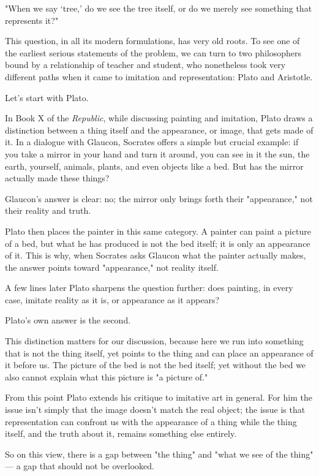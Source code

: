 "When we say `tree,' do we see the tree itself, or do we merely see something that represents it?"

This question, in all its modern formulations, has very old roots. To see one of the earliest serious statements of the problem, we can turn to two philosophers bound by a relationship of teacher and student, who nonetheless took very different paths when it came to imitation and representation: Plato and Aristotle.

Let's start with Plato.

In Book X of the \textit{Republic}, while discussing painting and imitation, Plato draws a distinction between a thing itself and the appearance, or image, that gets made of it. In a dialogue with Glaucon, Socrates offers a simple but crucial example: if you take a mirror in your hand and turn it around, you can see in it the sun, the earth, yourself, animals, plants, and even objects like a bed. But has the mirror actually made these things?

Glaucon's answer is clear: no; the mirror only brings forth their "appearance," not their reality and truth.

Plato then places the painter in this same category. A painter can paint a picture of a bed, but what he has produced is not the bed itself; it is only an appearance of it. This is why, when Socrates asks Glaucon what the painter actually makes, the answer points toward "appearance," not reality itself.

A few lines later Plato sharpens the question further: does painting, in every case, imitate reality as it is, or appearance as it appears?

Plato's own answer is the second.

This distinction matters for our discussion, because here we run into something that is not the thing itself, yet points to the thing and can place an appearance of it before us. The picture of the bed is not the bed itself; yet without the bed we also cannot explain what this picture is "a picture of."

From this point Plato extends his critique to imitative art in general. For him the issue isn't simply that the image doesn't match the real object; the issue is that representation can confront us with the appearance of a thing while the thing itself, and the truth about it, remains something else entirely.

So on this view, there is a gap between "the thing" and "what we see of the thing" --- a gap that should not be overlooked.

